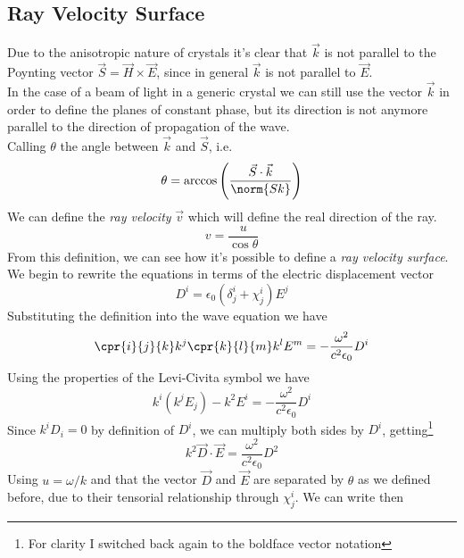 \documentclass[../electromagnetism.tex]{subfiles}
\begin{document}
\subsection{Ray Velocity Surface}
Due to the anisotropic nature of crystals it's clear that $\vec{k}$ is not parallel to the Poynting vector $\vec{S}=\vec{H}\times\vec{E}$, since in general $\vec{k}$ is not parallel to $\vec{E}$.\\
In the case of a beam of light in a generic crystal we can still use the vector $\vec{k}$ in order to define the planes of constant phase, but its direction is not anymore parallel to the direction of propagation of the wave.\\
Calling $\theta$ the angle between $\vec{k}$ and $\vec{S}$, i.e.
\begin{equation}
	\theta=\arccos\left( \frac{\vec{S}\cdot\vec{k}}{\norm{Sk}} \right)
	\label{eq:rayvelang.cry}
\end{equation}
We can define the \textit{ray velocity} $\vec{v}$ which will define the real direction of the ray.
\begin{equation}
	v=\frac{u}{\cos\theta}
	\label{eq:rayvel.cry}
\end{equation}
From this definition, we can see how it's possible to define a \textit{ray velocity surface}.\\
We begin to rewrite the equations in terms of the electric displacement vector
\begin{equation*}
	D^i=\epsilon_0\left( \delta^i_j+\chi^i_j \right)E^j
\end{equation*}
Substituting the definition into the wave equation we have
\begin{equation*}
	\cpr{i}{j}{k}k^j\cpr{k}{l}{m}k^lE^m=-\frac{\omega^2}{c^2\epsilon_0}D^i
\end{equation*}
Using the properties of the Levi-Civita symbol we have
\begin{equation*}
	k^i\left( k^jE_j \right)-k^2E^i=-\frac{\omega^2}{c^2\epsilon_0}D^i
\end{equation*}
Since $k^iD_i=0$ by definition of $D^i$, we can multiply both sides by $D^i$, getting\footnote{For clarity I switched back again to the boldface vector notation}
\begin{equation}
	k^2\vec{D}\cdot\vec{E}=\frac{\omega^2}{c^2\epsilon_0}D^2
	\label{eq:raysured.cry}
\end{equation}
Using $u=\omega/k$ and that the vector $\vec{D}$ and $\vec{E}$ are separated by $\theta$ as we defined before, due to their tensorial relationship through $\chi^i_j$. We can write then
\end{document}
